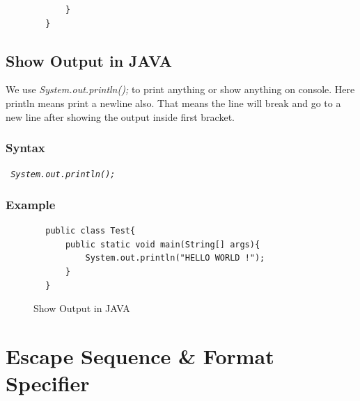\documentclass[openany]{book}  %
\begin{document}
\begin{flushleft}
\begin{center}
\begin{verbatim}
            }
        }
    \end{verbatim}
    \end{center}

    \section{Show Output in JAVA}
    We use \textit{System.out.println();} to print anything or show anything on console. Here println means print a newline also.
    That means the line will break and go to a new line after showing the output inside first bracket.
    \subsection{Syntax}
    \begin{center}
        \tt{
            \textit{System.out.println();}
        }
    \end{center}
    \subsection{Example}
    \begin{center}
        \begin{verbatim}
        public class Test{
            public static void main(String[] args){
                System.out.println("HELLO WORLD !");
            }
        }
    \end{verbatim}
    \end{center}
    \begin{figure}[htbp]
        \begin{center}
            \caption{Show Output in JAVA\cite{Ref3}}
        \end{center}
    \end{figure}

    \chapter{Escape Sequence \& Format Specifier}

\end{flushleft}
\end{document}
